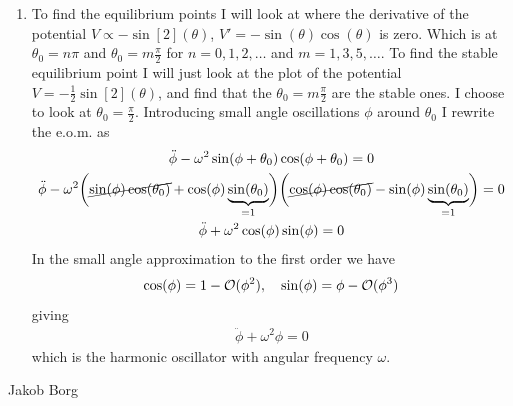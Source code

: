 \documentclass[11pt,a4paper]{report}
\newcounter{excount}[chapter]
\newenvironment{exercise}[1][]{\addtocounter{excount}{1} \noindent {\bf Problem
    \arabic{excount} \ \ #1}\hspace{2mm}}{\vspace{4mm}}
\newenvironment{solution}
    {\begin{tcolorbox}[title=Solution,halign lower=right,breakable]
    }
    {
    \tcblower Jakob Borg
    \end{tcolorbox}
	\vspace{5mm}
    }
\newcommand{\half}
{
\frac{1}{2}
}
\newcommand{\ddphi}
{
\ddot{\phi}
}
\newcommand{\cost}
{
\cos(\theta)
}
\newcommand{\sint}
{
\sin(\theta)
}
\newcommand{\cosp}
{
\cos(\phi)
}
\newcommand{\sinp}
{
\sin(\phi)
}
\begin{document}
\begin{exercise}
\begin{solution}
\begin{enumerate}[\bf a)]
\item To find the equilibrium points I will look at where the derivative of the potential ${V\propto -\sin[2](\theta)}$, ${V' = -\sint\cost}$ is zero. Which is at ${\theta_0 = n\pi}$ and ${\theta_0 = m\frac{\pi}{2}}$ for $n = 0,1,2,\ldots$ and $m=1,3,5,\ldots$.
To find the stable equilibrium point I will just look at the plot of the potential $V=-\half \sin[2](\theta)$, and find that the ${\theta_0 = m\frac{\pi}{2}}$ are the stable ones. I choose to look at $\theta_0 = \frac{\pi}{2}$. Introducing small angle oscillations $\phi$ around $\theta_0$ I rewrite the e.o.m. as
\begin{gather*}
\ddphi -\omega^2\sin(\phi + \theta_0)\cos(\phi + \theta_0) = 0
\\
\ddphi - \omega^2 
\biggl(\cancel{\sinp \cos(\theta_0)} + \cosp\underbrace{\sin(\theta_0)}_{=1} \biggr)\biggl(\cancel{\cosp\cos(\theta_0)} - \sinp  \underbrace{\sin(\theta_0)}_{=1} \biggr)
= 0
\\
\ddphi + \omega^2 \cosp\sinp = 0
\end{gather*}
In the small angle approximation to the first order we have
\begin{align*}
\cosp = 1 - \mathcal{O}(\phi^2) \qc \sinp = \phi - \mathcal{O}(\phi^3)
\end{align*}
giving
\begin{align*}
\ddphi + \omega^2 \phi = 0
\end{align*}
which is the harmonic oscillator with angular frequency $\omega$.
\end{enumerate}
\end{solution}
\end{exercise}
\end{document}
